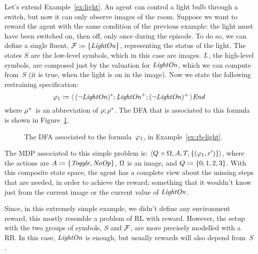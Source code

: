 \begin{example}
	Let's extend Example~\vref{ex:light}. An agent can control a light bulb
	through a switch, but now it can only observe images of the room. Suppose we
	want to reward the agent with the same condition of the previous example:
	the light must have been switched on, then off, only once during the
	episode. To do so, we can define a single fluent, $\mathcal{F} \coloneqq
	\{\text{\textit{LightOn}}\}$, representing the status of the light. The states $S$
	are the low-level symbols, which in this case are images. $L$, the
	high-level symbols, are composed just by the valuation for
	$\text{\textit{LightOn}}$, which we can compute from~$S$ (it is true, when the light
	is on in the image). Now we state the following \ldl{} restraining
	specification:
	\[
		\varphi_1 \coloneqq \langle\, {(\neg \text{\textit{LightOn}})^*;
		\text{\textit{LightOn}}^+; (\neg \text{\textit{LightOn}})^+} \,\rangle \text{\textit{End}}
	\]
	where $\rho^+$ is an abbreviation of $\rho; \rho^*$.  The DFA that is
	associated to this formula is shown in Figure~\ref{fig:rb-light-automa}.
	\begin{figure}
			\centering
			\caption{The DFA associated to the formula~$\varphi_1$, in
			Example~\ref{ex:rb-light}.}
			\label{fig:rb-light-automa}
	\end{figure}
	The MDP associated to this simple problem is: $\langle Q \times \Omega, A, T,
	\{(\varphi_1, r')\} \rangle$, where the actions are $A \coloneqq
	\{\text{\textit{Toggle}}, \text{\textit{NoOp}}\}$, $\Omega$ is an image, and $Q \coloneqq
	\{0, 1, 2, 3\}$. With this composite state space, the agent has a complete
	view about the missing steps that are needed, in order to achieve the
	reward; something that it wouldn't know just from the current image or the
	current value of $\text{\textit{LightOn}}$.

	Since, in this extremely simple example, we didn't define any environment
	reward, this mostly resemble a problem of RL with \ldl{} reward. However,
	the setup with the two groups of symbols, $S$ and $\mathcal{F}$, are more
	precisely modelled with a RB. In this case, $\text{\textit{LightOn}}$ is enough, but
	usually rewards will also depend from~$S$.
	\label{ex:rb-light}
\end{example}

